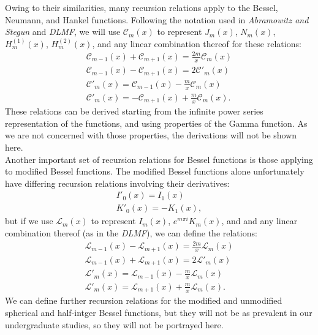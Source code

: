 \documentclass[11pt]{report}
\begin{document}
Owing to their similarities, many recursion relations apply to the Bessel, Neumann, and Hankel functions. Following the notation used in \emph{Abramowitz and Stegun} and \emph{DLMF}, we will use $\mathscr{C}_m(x)$ to represent $J_m(x)$, $N_m(x)$, $H_m^{(1)}(x)$, $H_m^{(2)}(x)$, and any linear combination thereof for these relations:
    \begin{align}
        \mathscr{C}_{m-1}(x)+\mathscr{C}_{m+1}(x)=\frac{2m}{x}\mathscr{C}_{m}(x)\\
        \mathscr{C}_{m-1}(x)-\mathscr{C}_{m+1}(x)=2\mathscr{C}'_{m}(x)\\
        \mathscr{C}'_{m}(x)=\mathscr{C}_{m-1}(x)-\frac{m}{x}\mathscr{C}_{m}(x)\\
        \mathscr{C}'_{m}(x)=-\mathscr{C}_{m+1}(x)+\frac{m}{x}\mathscr{C}_{m}(x).
    \end{align}
These relations can be derived starting from the infinite power series representation of the functions, and using properties of the Gamma function. As we are not concerned with those properties, the derivations will not be shown here.\\

Another important set of recursion relations for Bessel functions is those applying to modified Bessel functions. The modified Bessel functions alone unfortunately have differing recursion relations involving their derivatives:
    \begin{align}
        I'_0(x)=I_1(x)\\
        K'_0(x)=-K_1(x),
    \end{align}
but if we use $\mathscr{L}_m(x)$ to represent $I_m(x)$, $e^{m\pi i}K_m(x)$, and and any linear combination thereof (as in the \emph{DLMF}), we can define the relations:
    \begin{align}
        \mathscr{L}_{m-1}(x)-\mathscr{L}_{m+1}(x)=\frac{2m}{x}\mathscr{L}_{m}(x)\\
        \mathscr{L}_{m-1}(x)+\mathscr{L}_{m+1}(x)=2\mathscr{L}'_{m}(x)\\
        \mathscr{L}'_{m}(x)=\mathscr{L}_{m-1}(x)-\frac{m}{x}\mathscr{L}_{m}(x)\\
        \mathscr{L}'_{m}(x)=\mathscr{L}_{m+1}(x)+\frac{m}{x}\mathscr{L}_{m}(x).
    \end{align}
We can define further recursion relations for the modified and unmodified spherical and half-intger Bessel functions, but they will not be as prevalent in our undergraduate studies, so they will not be portrayed here.
\end{document}

